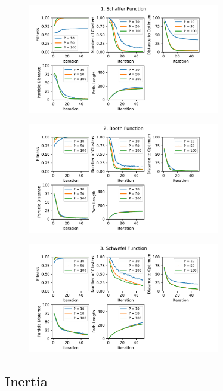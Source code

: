 \documentclass[12pt]{article}
\begin{document}
\begin{figure}
	\centering
	\includegraphics[width=0.75\textwidth]{figures/ex2/ex2-1.pdf}
	\label{fig:ex2-1}
\end{figure}
\begin{figure}
	\centering
	\includegraphics[width=0.75\textwidth]{figures/ex2/ex2-2.pdf}
	\label{fig:ex2-2}
\end{figure}
\begin{figure}
	\centering
	\includegraphics[width=0.75\textwidth]{figures/ex2/ex2-3.pdf}
	\label{fig:ex2-3}
\end{figure}



\subsection{Inertia}
\end{document}
